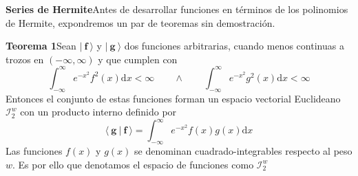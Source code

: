\documentclass[spanish,notitlepage,letterpaper,12pt]{article}
\begin{document}
\textbf{Series de Hermite}\newline Antes de desarrollar funciones en
t\'{e}rminos de los polinomios de Hermite, expondremos un par de teoremas sin
demostraci\'{o}n.

\textbf{Teorema 1}\newline Sean $|\ \mathbf{f\ }\rangle$ y $|\ \mathbf{g\ }%
\rangle$ dos funciones arbitrarias, cuando menos continuas a trozos en
$\left(  -\infty,\infty\right)  $ y que cumplen con
\[
\int_{-\infty}^{\infty}e^{-x^{2}}f^{2}(x)\mathrm{d}x<\infty\qquad\wedge
\qquad\int_{-\infty}^{\infty}e^{-x^{2}}g^{2}(x)\mathrm{d}x<\infty
\]
Entonces el conjunto de estas funciones forman un espacio vectorial Euclideano
$\mathcal{I}_{2}^{w}$ con un producto interno definido por
\[
\langle\ \mathbf{g}\ |\ \mathbf{f\ }\rangle=\int_{-\infty}^{\infty}e^{-x^{2}%
}f(x)g(x)\mathrm{d}x
\]
Las funciones $f(x)$ y $g(x)$ se denominan cuadrado-integrables respecto al
peso $w$. Es por ello que denotamos el espacio de funciones como
$\mathcal{I}_{2}^{w}$
\end{document}
